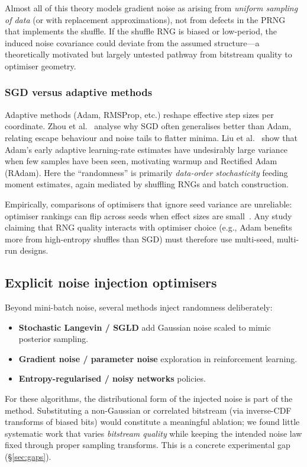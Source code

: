 \begin{remark}
Almost all of this theory models gradient noise as arising from \emph{uniform sampling of data} (or with replacement approximations), not from defects in the PRNG that implements the shuffle.
If the shuffle RNG is biased or low-period, the induced noise covariance could deviate from the assumed structure---a theoretically motivated but largely untested pathway from bitstream quality to optimiser geometry.
\end{remark}

\subsubsection{SGD versus adaptive methods}

Adaptive methods (Adam, RMSProp, etc.) reshape effective step sizes per coordinate.
Zhou et al.~\cite{zhou2020adamsgd} analyse why SGD often generalises better than Adam, relating escape behaviour and noise tails to flatter minima.
Liu et al.~\cite{liu2020radam} show that Adam's early adaptive learning-rate estimates have undesirably large variance when few samples have been seen, motivating warmup and Rectified Adam (RAdam).
Here the ``randomness'' is primarily \emph{data-order stochasticity} feeding moment estimates, again mediated by shuffling RNGs and batch construction.

Empirically, comparisons of optimisers that ignore seed variance are unreliable: optimiser rankings can flip across seeds when effect sizes are small~\cite{akesson2024reporting,picard2021torch}.
Any study claiming that RNG quality interacts with optimiser choice (e.g., Adam benefits more from high-entropy shuffles than SGD) must therefore use multi-seed, multi-run designs.

\subsection{Explicit noise injection optimisers}

Beyond mini-batch noise, several methods inject randomness deliberately:
\begin{itemize}[leftmargin=*]
  \item \textbf{Stochastic Langevin / SGLD} add Gaussian noise scaled to mimic posterior sampling.
  \item \textbf{Gradient noise / parameter noise} exploration in reinforcement learning.
  \item \textbf{Entropy-regularised / noisy networks} policies.
\end{itemize}
For these algorithms, the distributional form of the injected noise is part of the method.
Substituting a non-Gaussian or correlated bitstream (via inverse-CDF transforms of biased bits) would constitute a meaningful ablation; we found little systematic work that varies \emph{bitstream quality} while keeping the intended noise law fixed through proper sampling transforms.
This is a concrete experimental gap (\S\ref{sec:gaps}).

